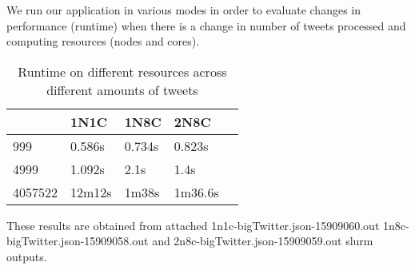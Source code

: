 \documentclass[11pt]{article}
\begin{document}
We run our application in various modes in order to evaluate changes in performance (runtime) when there is a change in number of tweets processed and computing resources (nodes and cores).

\begin{table}[h]
 \begin{center}
\begin{tabular}{|l|l|l|l|l|}

      \hline
       &1N1C & 1N8C & 2N8C  \\
      \hline\hline
      999 & 0.586s & 0.734s & 0.823s \\
      4999 & 1.092s & 2.1s & 1.4s \\
      4057522 & 12m12s & 1m38s & 1m36.6s \\

     \hline

\end{tabular}
\caption{Runtime on different resources across different amounts of tweets}\label{table2}
 \end{center}
\end{table}



These results are obtained from attached 1n1c-bigTwitter.json-15909060.out 1n8c-bigTwitter.json-15909058.out and 2n8c-bigTwitter.json-15909059.out slurm outputs.
\end{document}
